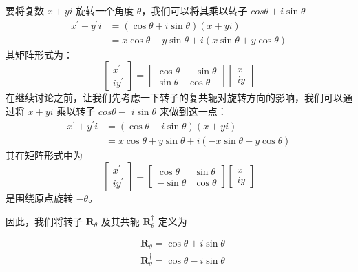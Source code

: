 要将复数 $x+y i$ 旋转一个角度 $\theta$，我们可以将其乘以转子 $cos \theta+i \sin \theta$
$$
    \begin{aligned}
        x^{\prime}+y^{\prime} i & =(\cos \theta+i \sin \theta)(x+y i)                         \\
                                & =x \cos \theta-y \sin \theta+i(x \sin \theta+y \cos \theta)
    \end{aligned}
$$
其矩阵形式为：
$$
    \left[\begin{array}{r}
            x^{\prime} \\
            i y^{\prime}
        \end{array}\right]=\left[\begin{array}{rr}
            \cos \theta & -\sin \theta \\
            \sin \theta & \cos \theta
        \end{array}\right]\left[\begin{array}{c}
            x \\
            i y
        \end{array}\right]
$$
在继续讨论之前，让我们先考虑一下转子的复共轭对旋转方向的影响，我们可以通过将 $x+y i$ 乘以转子 $cos \theta-$ $i \sin \theta$ 来做到这一点：
$$
    \begin{aligned}
        x^{\prime}+y^{\prime} i & =(\cos \theta-i \sin \theta)(x+y i)                          \\
                                & =x \cos \theta+y \sin \theta+i(-x \sin \theta+y \cos \theta)
    \end{aligned}
$$
其在矩阵形式中为
$$
    \left[\begin{array}{r}
            x^{\prime} \\
            i y^{\prime}
        \end{array}\right]=\left[\begin{array}{rr}
            \cos \theta  & \sin \theta \\
            -\sin \theta & \cos \theta
        \end{array}\right]\left[\begin{array}{c}
            x \\
            i y
        \end{array}\right]
$$
是围绕原点旋转 $-\theta$。

因此，我们将转子 $\mathbf{R}_{\theta}$ 及其共轭 $\mathbf{R}_{\theta}^{\dagger}$ 定义为

$$
    \begin{aligned}
         & \mathbf{R}_{\theta}=\cos \theta+i \sin \theta           \\
         & \mathbf{R}_{\theta}^{\dagger}=\cos \theta-i \sin \theta
    \end{aligned}
$$

